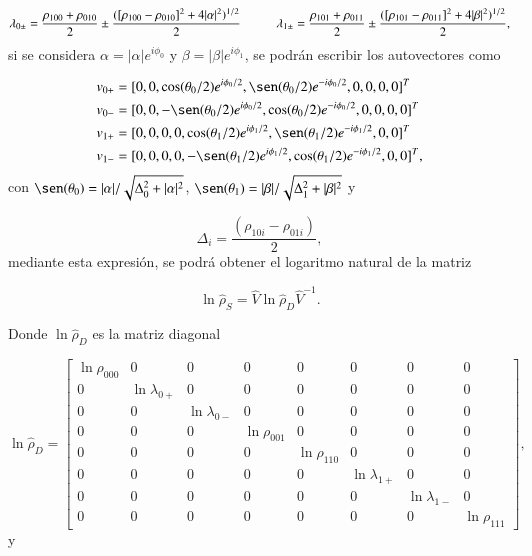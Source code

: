 \begin{appendixs}
\begin{equation*}
    \lambda_{0\pm} = \frac{ \rho_{100} +\rho_{010} }{2} \pm \frac{( [\rho_{100} - \rho_{010}]^{2} + 4|\alpha|^{2} )^{1/2} }{ 2 }  \hspace{10mm}      \lambda_{1\pm} = \frac{ \rho_{101} +\rho_{011} }{2} \pm \frac{( [\rho_{101} - \rho_{011}]^{2} + 4|\beta|^{2} )^{1/2} }{ 2 }, 
\end{equation*}
si se considera $\alpha = |\alpha|e^{i\phi_{0}}$ y $\beta = |\beta|e^{i\phi_{1}}$, se podrán escribir los autovectores como

\begin{align*}
    v_{0+} &  = [0,0,\cos(\theta_{0}/2)e^{i\phi_{0}/2},\sen(\theta_{0}/2)e^{-i\phi_{0}/2},0,0,0,0]^{T} \\
    v_{0-} &  = [0,0,-\sen(\theta_{0}/2)e^{i\phi_{0}/2},\cos(\theta_{0}/2)e^{-i\phi_{0}/2},0,0,0,0]^{T} \\
    v_{1+} &  = [0,0,0,0,\cos(\theta_{1}/2)e^{i\phi_{1}/2},\sen(\theta_{1}/2)e^{-i\phi_{1}/2},0,0]^{T} \\
    v_{1-} &  = [0,0,0,0,-\sen(\theta_{1}/2)e^{i\phi_{1}/2},\cos(\theta_{1}/2)e^{-i\phi_{1}/2},0,0]^{T},                   
\end{align*}
con $\sen(\theta_{0}) = |\alpha|/\sqrt{\Delta^{2}_{0} + |\alpha|^{2}}$, $\sen(\theta_{1}) = |\beta|/\sqrt{\Delta^{2}_{1} + |\beta|^{2}}$ y

\begin{equation*}
    \Delta_{i} = \frac{(\rho_{10i} - \rho_{01i})}{2},
\end{equation*}
mediante esta expresión, se podrá obtener el logaritmo natural de la matriz 

\begin{equation*}
    \ln \hat{\rho}_{S} = \hat{V}\ln \hat{\rho}_{D} \hat{V}^{-1}.
\end{equation*}
    
Donde $\ln \hat{\rho}_{D}$ es la matriz diagonal 

\begin{equation*}
    \ln \hat{\rho}_{D} = 
    \begin{bmatrix}
        \ln \rho_{000} & 0 & 0 & 0 & 0 & 0 & 0 & 0 \\
        0 & \ln \lambda_{0+} & 0 & 0 & 0 & 0 & 0 & 0 \\
        0 & 0 & \ln \lambda_{0-} & 0 & 0 & 0 & 0 & 0 \\
        0 & 0 & 0 & \ln \rho_{001} & 0 & 0 & 0 & 0 \\
        0 & 0 & 0 & 0 & \ln \rho_{110} & 0 & 0 & 0 \\
        0 & 0 & 0 & 0 & 0 & \ln \lambda_{1+} & 0 & 0 \\
        0 & 0 & 0 & 0 & 0 & 0 & \ln \lambda_{1-} & 0 \\
        0 & 0 & 0 & 0 & 0 & 0 & 0 & \ln \rho_{111} 
        \end{bmatrix},
\end{equation*}
y 


\end{appendixs}
